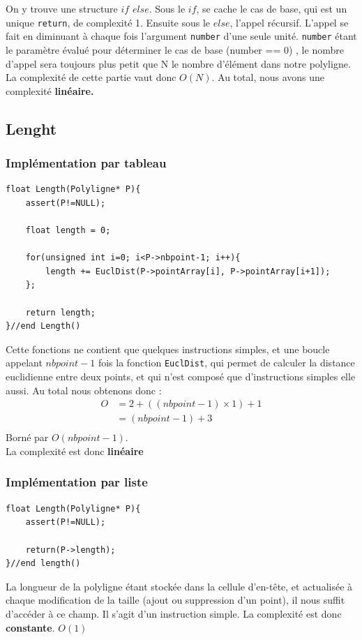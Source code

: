 \documentclass[a4paper, 11pt, oneside]{article}
\begin{document}
\bigskip

On y trouve une structure $if$  $else$. Sous le $if$, se cache le cas de base, qui est un unique \texttt{return}, de complexité 1.
Ensuite sous le $else$, l’appel récursif.  L’appel se fait en diminuant à chaque fois l'argument \texttt{number} d’une seule unité. \texttt{number} étant le paramètre évalué pour déterminer le cas de base (number == 0) , le nombre d’appel sera toujours plus petit que  N le nombre d’élément dans notre polyligne. 
La complexité de cette partie vaut donc  $O(N)$.
Au total, nous avons une complexité \textbf{linéaire.} 



\subsection{Lenght}
\subsubsection{Implémentation par tableau}
\begin{lstlisting}
float Length(Polyligne* P){
    assert(P!=NULL);

    float length = 0;

    for(unsigned int i=0; i<P->nbpoint-1; i++){
        length += EuclDist(P->pointArray[i], P->pointArray[i+1]);
    };

    return length;
}//end Length()
\end{lstlisting}
Cette fonctions ne contient que quelques instructions simples, et une boucle appelant $nbpoint-1$ fois la fonction \texttt{EuclDist}, qui permet de calculer la distance euclidienne entre deux points, et qui n'est composé que d'instructions simples elle aussi. 
Au total nous obtenons donc :
\begin{align}
  O &= 2 + ((nbpoint-1) \times 1) + 1 \nonumber \\
       &= (nbpoint-1) + 3 \nonumber \\
\end{align}
Borné par $O(nbpoint-1)$.
\\La complexité est donc \textbf{linéaire}

\subsubsection{Implémentation par liste}
\begin{lstlisting}
float Length(Polyligne* P){
    assert(P!=NULL);
    
    return(P->length);
}//end length()
\end{lstlisting}
La longueur de la polyligne étant stockée dans la cellule d'en-tête, et actualisée à chaque modification de la taille (ajout ou suppression d'un point), il nous suffit d'accéder à ce champ. 
Il s'agit d'un instruction simple. La complexité est donc \textbf{constante}. $O(1)$
\end{document}
